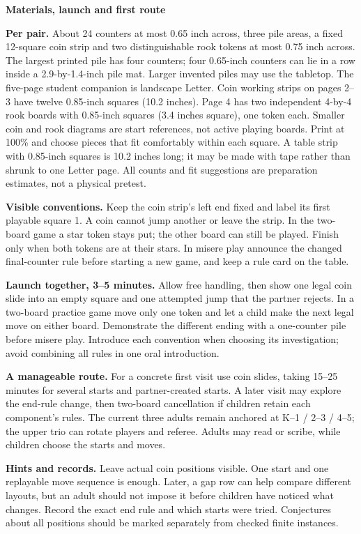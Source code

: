 \documentclass[11pt]{article}
\newcommand{\parttitle}[1]{{\large\bfseries\color{ink}#1}\par}
\newcommand{\labelled}[2]{\textbf{#1} #2\par}
\begin{document}
\newpage
\parttitle{Materials, launch and first route}
\labelled{Per pair.}{About 24 counters at most 0.65 inch across, three pile areas, a fixed 12-square coin strip and two distinguishable rook tokens at most 0.75 inch across. The largest printed pile has four counters; four 0.65-inch counters can lie in a row inside a 2.9-by-1.4-inch pile mat. Larger invented piles may use the tabletop. The five-page student companion is landscape Letter. Coin working strips on pages 2--3 have twelve 0.85-inch squares (10.2 inches). Page 4 has two independent 4-by-4 rook boards with 0.85-inch squares (3.4 inches square), one token each. Smaller coin and rook diagrams are start references, not active playing boards. Print at 100\% and choose pieces that fit comfortably within each square. A table strip with 0.85-inch squares is 10.2 inches long; it may be made with tape rather than shrunk to one Letter page. All counts and fit suggestions are preparation estimates, not a physical pretest.}
\labelled{Visible conventions.}{Keep the coin strip's left end fixed and label its first playable square 1. A coin cannot jump another or leave the strip. In the two-board game a star token stays put; the other board can still be played. Finish only when both tokens are at their stars. In misere play announce the changed final-counter rule before starting a new game, and keep a rule card on the table.}
\labelled{Launch together, 3--5 minutes.}{Allow free handling, then show one legal coin slide into an empty square and one attempted jump that the partner rejects. In a two-board practice game move only one token and let a child make the next legal move on either board. Demonstrate the different ending with a one-counter pile before misere play. Introduce each convention when choosing its investigation; avoid combining all rules in one oral introduction.}
\labelled{A manageable route.}{For a concrete first visit use coin slides, taking 15--25 minutes for several starts and partner-created starts. A later visit may explore the end-rule change, then two-board cancellation if children retain each component's rules. The current three adults remain anchored at K--1 / 2--3 / 4--5; the upper trio can rotate players and referee. Adults may read or scribe, while children choose the starts and moves.}
\labelled{Hints and records.}{Leave actual coin positions visible. One start and one replayable move sequence is enough. Later, a gap row can help compare different layouts, but an adult should not impose it before children have noticed what changes. Record the exact end rule and which starts were tried. Conjectures about all positions should be marked separately from checked finite instances.}
\end{document}
